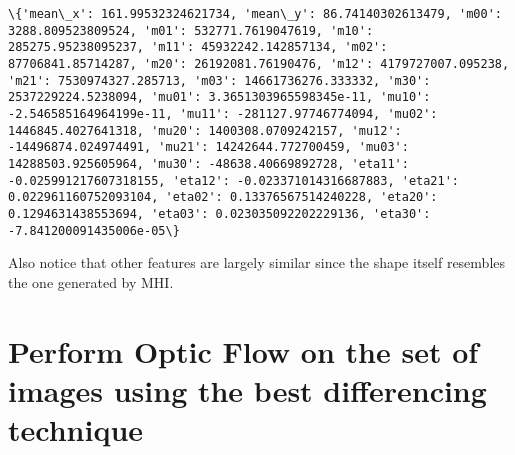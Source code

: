 \documentclass[11pt]{article}
\begin{document}
    \begin{Verbatim}[commandchars=\\\{\}]
\{'mean\_x': 161.99532324621734, 'mean\_y': 86.74140302613479, 'm00': 3288.809523809524, 'm01': 532771.7619047619, 'm10': 285275.95238095237, 'm11': 45932242.142857134, 'm02': 87706841.85714287, 'm20': 26192081.76190476, 'm12': 4179727007.095238, 'm21': 7530974327.285713, 'm03': 14661736276.333332, 'm30': 2537229224.5238094, 'mu01': 3.3651303965598345e-11, 'mu10': -2.546585164964199e-11, 'mu11': -281127.97746774094, 'mu02': 1446845.4027641318, 'mu20': 1400308.0709242157, 'mu12': -14496874.024974491, 'mu21': 14242644.772700459, 'mu03': 14288503.925605964, 'mu30': -48638.40669892728, 'eta11': -0.025991217607318155, 'eta12': -0.023371014316687883, 'eta21': 0.022961160752093104, 'eta02': 0.13376567514240228, 'eta20': 0.1294631438553694, 'eta03': 0.023035092202229136, 'eta30': -7.841200091435006e-05\}

    \end{Verbatim}

    Also notice that other features are largely similar since the shape
itself resembles the one generated by MHI.

    \hypertarget{perform-optic-flow-on-the-set-of-images-using-the-best-differencing-technique}{%
\section{Perform Optic Flow on the set of images using the best
differencing
technique}\label{perform-optic-flow-on-the-set-of-images-using-the-best-differencing-technique}}
\end{document}
